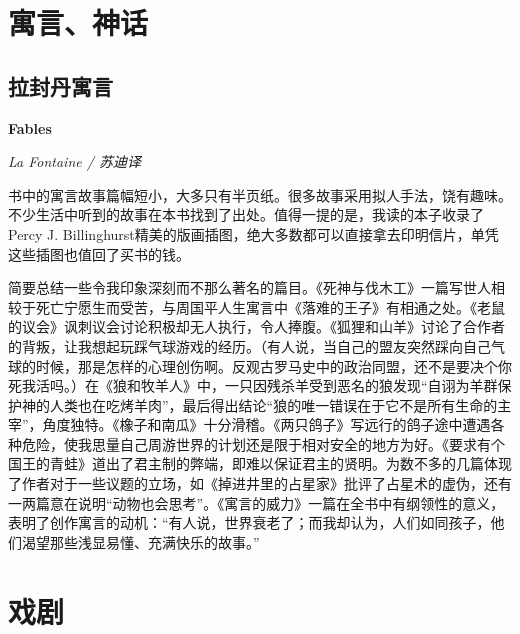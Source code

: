\section{寓言、神话}

\subsection*{拉封丹寓言}
\par \textbf{Fables}
\par \emph{La Fontaine / 苏迪译} 
\par 书中的寓言故事篇幅短小，大多只有半页纸。很多故事采用拟人手法，饶有趣味。不少生活中听到的故事在本书找到了出处。值得一提的是，我读的本子收录了Percy J. Billinghurst精美的版画插图，绝大多数都可以直接拿去印明信片，单凭这些插图也值回了买书的钱。
\par 简要总结一些令我印象深刻而不那么著名的篇目。《死神与伐木工》一篇写世人相较于死亡宁愿生而受苦，与周国平人生寓言中《落难的王子》有相通之处。《老鼠的议会》讽刺议会讨论积极却无人执行，令人捧腹。《狐狸和山羊》讨论了合作者的背叛，让我想起玩踩气球游戏的经历。（有人说，当自己的盟友突然踩向自己气球的时候，那是怎样的心理创伤啊。反观古罗马史中的政治同盟，还不是要决个你死我活吗。）在《狼和牧羊人》中，一只因残杀羊受到恶名的狼发现“自诩为羊群保护神的人类也在吃烤羊肉”，最后得出结论“狼的唯一错误在于它不是所有生命的主宰”，角度独特。《橡子和南瓜》十分滑稽。《两只鸽子》写远行的鸽子途中遭遇各种危险，使我思量自己周游世界的计划还是限于相对安全的地方为好。《要求有个国王的青蛙》道出了君主制的弊端，即难以保证君主的贤明。为数不多的几篇体现了作者对于一些议题的立场，如《掉进井里的占星家》批评了占星术的虚伪，还有一两篇意在说明“动物也会思考”。《寓言的威力》一篇在全书中有纲领性的意义，表明了创作寓言的动机：“有人说，世界衰老了；而我却认为，人们如同孩子，他们渴望那些浅显易懂、充满快乐的故事。”

\par {}

\section{戏剧}


